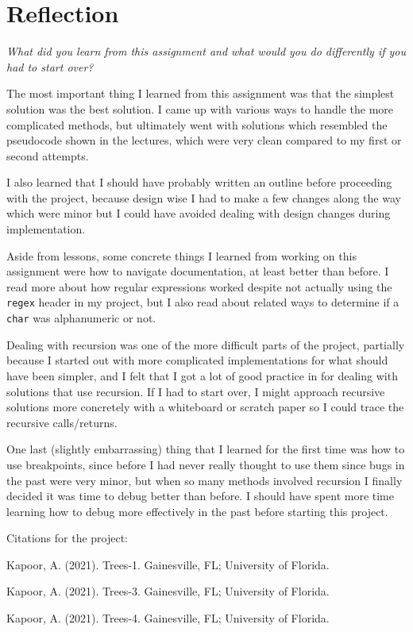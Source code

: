 \documentclass[11pt]{article}
\begin{document}
\section{Reflection}
\textit{What did you learn from this assignment and what would you do differently if you had to start over?}

The most important thing I learned from this assignment was that the simplest solution was the best solution. I came up with various ways to handle the more complicated methods, but ultimately went with solutions which resembled the pseudocode shown in the lectures, which were very clean compared to my first or second attempts.

I also learned that I should have probably written an outline before proceeding with the project, because design wise I had to make a few changes along the way which were minor but I could have avoided dealing with design changes during implementation.

Aside from lessons, some concrete things I learned from working on this assignment were how to navigate documentation, at least better than before. I read more about how regular expressions worked despite not actually using the \texttt{regex} header in my project, but I also read about related ways to determine if a \texttt{char} was alphanumeric or not.

Dealing with recursion was one of the more difficult parts of the project, partially because I started out with more complicated implementations for what should have been simpler, and I felt that I got a lot of good practice in for dealing with solutions that use recursion. If I had to start over, I might approach recursive solutions more concretely with a whiteboard or scratch paper so I could trace the recursive calls/returns.

One last (slightly embarrassing) thing that I learned for the first time was how to use breakpoints, since before I had never really thought to use them since bugs in the past were very minor, but when so many methods involved recursion I finally decided it was time to debug better than before. I should have spent more time learning how to debug more effectively in the past before starting this project.

Citations for the project: 

Kapoor, A. (2021). Trees-1. Gainesville, FL; University of Florida. 

Kapoor, A. (2021). Trees-3. Gainesville, FL; University of Florida. 

Kapoor, A. (2021). Trees-4. Gainesville, FL; University of Florida.  
\end{document}
